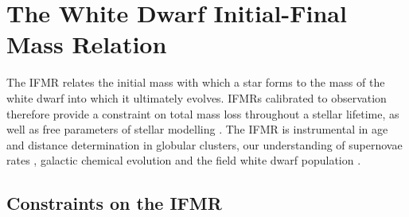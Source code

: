 \section{The White Dwarf Initial-Final Mass Relation}
\label{sec: Section 4}




The IFMR relates the initial mass with which a star forms to the mass of the white dwarf into which it ultimately evolves. IFMRs calibrated to observation therefore provide a constraint on total mass loss throughout a stellar lifetime, as well as free parameters of stellar modelling \cite{KaliraiMAssLoss, Cummings_2019}. The IFMR is instrumental in age and distance determination in globular clusters, our understanding of supernovae rates \cite{Greggio-TypeIa}, galactic chemical evolution and the field white dwarf population \cite{Kalirai:2007tq}. 


\subsection{Constraints on the IFMR}

